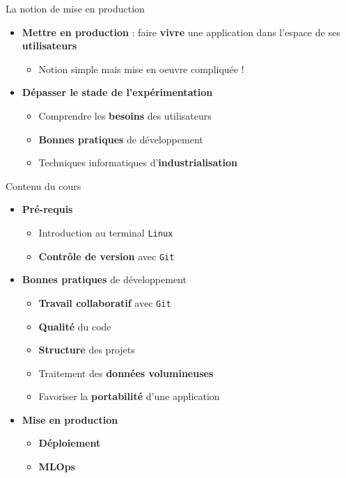 \documentclass[
  ignorenonframetext,
]{beamer}
\providecommand{\tightlist}{%
  \setlength{\itemsep}{0pt}\setlength{\parskip}{0pt}}\usepackage{longtable,booktabs,array}
\begin{document}
\begin{frame}{La notion de mise en production}
\label{la-notion-de-mise-en-production}
\begin{itemize}[<+->]
\tightlist
\item
  {\textbf{Mettre en production}} : faire {\textbf{vivre}} une
  application dans l'espace de ses {\textbf{utilisateurs}}

  \begin{itemize}[<+->]
  \tightlist
  \item
    Notion simple mais mise en oeuvre compliquée !
  \end{itemize}
\item
  {\textbf{Dépasser le stade de l'expérimentation}}

  \begin{itemize}[<+->]
  \tightlist
  \item
    Comprendre les {\textbf{besoins}} des utilisateurs
  \item
    {\textbf{Bonnes pratiques}} de développement
  \item
    Techniques informatiques d'{\textbf{industrialisation}}
  \end{itemize}
\end{itemize}
\end{frame}

\begin{frame}[fragile]{Contenu du cours}
\label{contenu-du-cours}
\begin{itemize}[<+->]
\tightlist
\item
  {\textbf{Pré-requis}}

  \begin{itemize}[<+->]
  \tightlist
  \item
    Introduction au terminal \texttt{Linux}
  \item
    {\textbf{Contrôle de version}} avec \texttt{Git}
  \end{itemize}
\item
  {\textbf{Bonnes pratiques}} de développement

  \begin{itemize}[<+->]
  \tightlist
  \item
    {\textbf{Travail collaboratif}} avec \texttt{Git}
  \item
    {\textbf{Qualité}} du code
  \item
    {\textbf{Structure}} des projets
  \item
    Traitement des {\textbf{données volumineuses}}
  \item
    Favoriser la {\textbf{portabilité}} d'une application
  \end{itemize}
\item
  {\textbf{Mise en production}}

  \begin{itemize}[<+->]
  \tightlist
  \item
    {\textbf{Déploiement}}
  \item
    {\textbf{MLOps}}
  \end{itemize}
\end{itemize}
\end{frame}
\end{document}
